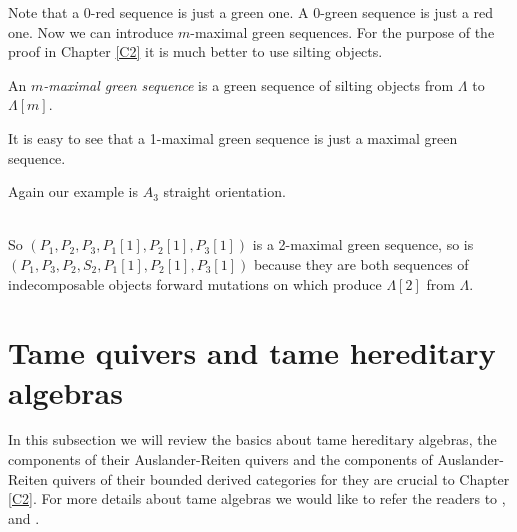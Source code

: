 \indent Note that a $0$-red sequence is just a green one. A $0$-green sequence is just a red one. Now we can introduce $m$-maximal green sequences. For the purpose of the proof in Chapter \ref{C2} it is much better to use silting objects.\\
\begin{definition}
An \textit{$m$-maximal green sequence} is a green sequence of silting objects from $\Lambda$ to $\Lambda[m]$.
\end{definition}
\indent It is easy to see that a 1-maximal green sequence is just a maximal green sequence.\\
\begin{example}
\indent Again our example is $A_3$ straight orientation.\\
\\
\indent So $(P_1,P_2,P_3,P_1[1],P_2[1],P_3[1])$ is a 2-maximal green sequence, so is $(P_1,P_3,P_2,S_2,P_1[1],P_2[1],P_3[1])$ because they are both sequences of indecomposable objects forward mutations on which produce $\Lambda[2]$ from $\Lambda$. \\
\end{example}
\section{Tame quivers and tame hereditary algebras}
\indent In this subsection we will review the basics about tame hereditary algebras, the components of their Auslander-Reiten quivers and the components of Auslander-Reiten quivers of their bounded derived categories for they are crucial to Chapter \ref{C2}. For more details about tame algebras we would like to refer the readers to \cite{DR76}, \cite{R84} and \cite{SS06}.\\
